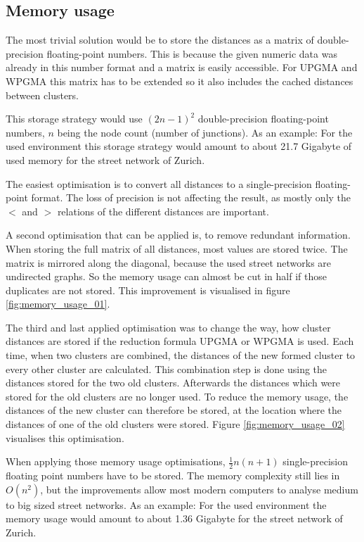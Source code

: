 \subsection{Memory usage} \label{sec:memory_usage}
The most trivial solution would be to store the distances as a matrix of double-precision floating-point numbers. This is because the given numeric data was already in this number format and a matrix is easily accessible. For \acrshort{UPGMA} and \acrshort{WPGMA} this matrix has to be extended so it also includes the cached distances between clusters.

This storage strategy would use $(2n-1)^2$ double-precision floating-point numbers, $n$ being the node count (number of junctions). As an example: For the used environment this storage strategy would amount to about 21.7 Gigabyte of used memory for the street network of Zurich.

The easiest optimisation is to convert all distances to a single-precision floating-point format. The loss of precision is not affecting the result, as mostly only the $<$ and $>$ relations of the different distances are important.

A second optimisation that can be applied is, to remove redundant information. When storing the full matrix of all distances, most values are stored twice. The matrix is mirrored along the diagonal, because the used street networks are undirected graphs. So the memory usage can almost be cut in half if those duplicates are not stored. This improvement is visualised in figure \ref{fig:memory_usage_01}.

The third and last applied optimisation was to change the way, how cluster distances are stored if the reduction formula \acrshort{UPGMA} or \acrshort{WPGMA} is used. Each time, when two clusters are combined, the distances of the new formed cluster to every other cluster are calculated. This combination step is done using the distances stored for the two old clusters. Afterwards the distances which were stored for the old clusters are no longer used. To reduce the memory usage, the distances of the new cluster can therefore be stored, at the location where the distances of one of the old clusters were stored. Figure \ref{fig:memory_usage_02} visualises this optimisation.

When applying those memory usage optimisations, $\frac{1}{2}n(n+1)$ single-precision floating point numbers have to be stored. The memory complexity still lies in $O(n^2)$, but the improvements allow most modern computers to analyse medium to big sized street networks. As an example: For the used environment the memory usage would amount to about 1.36 Gigabyte for the street network of Zurich.

